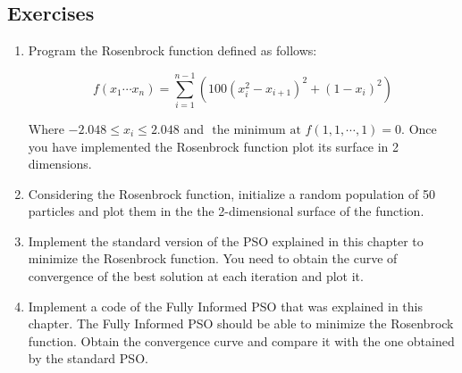 \subsection{Exercises}
\label{sec:exeercises}

\begin{enumerate}
    \item Program the Rosenbrock function defined as follows:
    
    \begin{equation} \label{eq:rosen}
    f(x_1 \cdots x_n) = \sum_{i=1}^{n-1} (100(x_i^2 - x_{i+1})^2 + (1-x_i)^2)
\end{equation}

Where $-2.048 \leq x_i \leq 2.048$ and $\text{ the minimum at }f(1, 1, \cdots, 1) = 0$.  Once you have implemented the Rosenbrock function plot its surface in 2 dimensions.

    \item Considering the Rosenbrock function, initialize a random population of 50 particles and plot them in the the 2-dimensional surface of the function.
    
    \item Implement the standard version of the PSO explained in this chapter to minimize the Rosenbrock function. You need to obtain the curve of convergence of the best solution at each iteration and plot it.
    
    \item Implement a code of the Fully Informed PSO that was explained in this chapter. The Fully Informed PSO should be able to minimize the Rosenbrock function. Obtain the convergence curve and compare it with the one obtained by the standard PSO. 
    
\end{enumerate}




